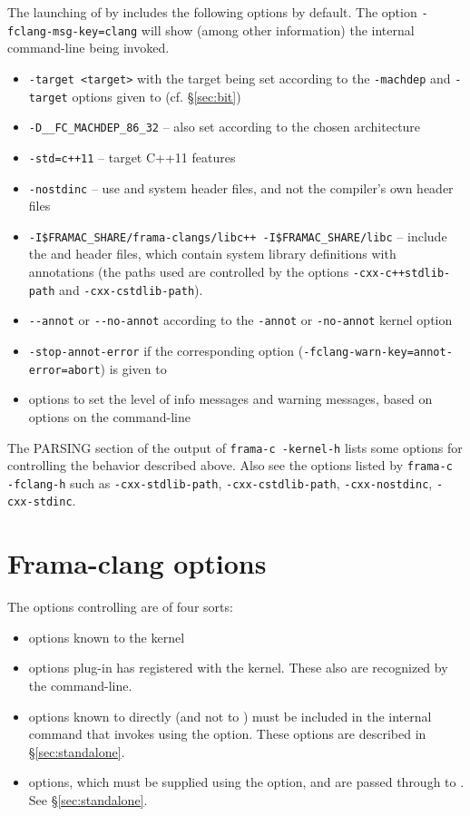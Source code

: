The launching of \irg by \framac includes the following options by default. The \fc option \lstinline|-fclang-msg-key=clang| will show (among other information) the internal command-line being invoked.
\begin{itemize}
\item \verb|-target <target>| with the target being set according to the \lstinline|-machdep| and \lstinline|-target| options given to \framac (cf. \S\ref{sec:bit})
\item \verb|-D__FC_MACHDEP_86_32| -- also set according to the chosen architecture
\item \verb|-std=c++11| -- target C++11 features
\item \verb|-nostdinc| -- use \fcl and \framac system header files, and not the compiler's own header files
\item \verb|-I$FRAMAC_SHARE/frama-clangs/libc++ -I$FRAMAC_SHARE/libc| -- include the \fclang and \framac header files, which contain system library definitions with \acslpp annotations (the paths used are controlled by the \fc options \lstinline|-cxx-c++stdlib-path| and \lstinline|-cxx-cstdlib-path|).
\item \verb|--annot| or \verb|--no-annot| according to the \verb|-annot| or \verb|-no-annot| \Framac kernel option
\item \verb|-stop-annot-error| if the corresponding option (\lstinline|-fclang-warn-key=annot-error=abort|) is given to \framac
\item options to set the level of info messages and warning messages, based on options on the \fc command-line
\end{itemize}

The PARSING section of the output of \lstinline|frama-c -kernel-h| lists some options for controlling the behavior described above. Also see the options listed by \lstinline|frama-c -fclang-h| such as \lstinline|-cxx-stdlib-path|, \lstinline|-cxx-cstdlib-path|, \lstinline|-cxx-nostdinc|, \lstinline|-cxx-stdinc|.

\section{Frama-clang options}

The options controlling \fclang are of four sorts:
\begin{itemize}
\item options known to the \framac kernel 
\item options  \fcl plug-in has registered with the \fc kernel. These also are recognized by the \fc command-line.
\item options known to \irg directly (and not to \fc) must be 
included in the internal command that invokes \irg using the  option. These options are described in \S\ref{sec:standalone}.
\item \clang options, which must be supplied using the  option, and are passed through \irg to \cl. See \S\ref{sec:standalone}.
\end{itemize}

